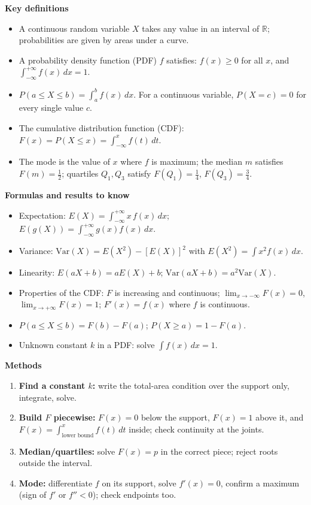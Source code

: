 \documentclass[11pt]{article}
\newcommand{\cle}[1]{{\popxbold\color{popdark}#1}}
\begin{document}
\begin{bilan}
\textbf{Key definitions}
\begin{itemize}
  \item A \cle{continuous random variable} $X$ takes any value in an interval of $\mathbb{R}$; probabilities are given by areas under a curve.
  \item A \cle{probability density function} (PDF) $f$ satisfies: $f(x)\ge 0$ for all $x$, and $\displaystyle\int_{-\infty}^{+\infty} f(x)\,dx = 1$.
  \item $\displaystyle P(a\le X\le b)=\int_a^b f(x)\,dx$. For a continuous variable, $P(X=c)=0$ for every single value $c$.
  \item The \cle{cumulative distribution function} (CDF): $\displaystyle F(x)=P(X\le x)=\int_{-\infty}^{x} f(t)\,dt$.
  \item The \cle{mode} is the value of $x$ where $f$ is maximum; the \cle{median} $m$ satisfies $F(m)=\tfrac12$; \cle{quartiles} $Q_1,Q_3$ satisfy $F(Q_1)=\tfrac14$, $F(Q_3)=\tfrac34$.
\end{itemize}

\textbf{Formulas and results to know}
\begin{itemize}
  \item Expectation: $\displaystyle E(X)=\int_{-\infty}^{+\infty} x\,f(x)\,dx$; \quad $\displaystyle E(g(X))=\int_{-\infty}^{+\infty} g(x)f(x)\,dx$.
  \item Variance: $\mathrm{Var}(X)=E(X^2)-[E(X)]^2$ with $\displaystyle E(X^2)=\int x^2 f(x)\,dx$.
  \item Linearity: $E(aX+b)=aE(X)+b$; \quad $\mathrm{Var}(aX+b)=a^2\mathrm{Var}(X)$.
  \item Properties of the CDF: $F$ is increasing and continuous; $\lim_{x\to-\infty}F(x)=0$, $\lim_{x\to+\infty}F(x)=1$; $F'(x)=f(x)$ where $f$ is continuous.
  \item $P(a\le X\le b)=F(b)-F(a)$; \quad $P(X\ge a)=1-F(a)$.
  \item Unknown constant $k$ in a PDF: solve $\displaystyle\int f(x)\,dx = 1$.
\end{itemize}

\textbf{Methods}
\begin{enumerate}
  \item \textbf{Find a constant $k$:} write the total-area condition over the support only, integrate, solve.
  \item \textbf{Build $F$ piecewise:} $F(x)=0$ below the support, $F(x)=1$ above it, and $F(x)=\int_{\text{lower bound}}^{x} f(t)\,dt$ inside; check continuity at the joints.
  \item \textbf{Median/quartiles:} solve $F(x)=p$ in the correct piece; reject roots outside the interval.
  \item \textbf{Mode:} differentiate $f$ on its support, solve $f'(x)=0$, confirm a maximum (sign of $f'$ or $f''<0$); check endpoints too.
\end{enumerate}


\end{bilan}
\end{document}
